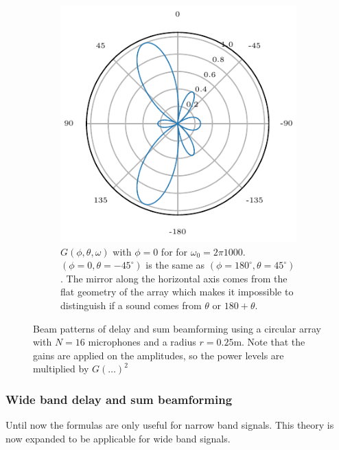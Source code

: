 \begin{figure}[ht]
\begin{subfigure}[t]{0.45\textwidth}
		\includegraphics[width=\textwidth]{radial_1200_circ_theta_single.pdf}
		\caption{\(G(\phi, \theta, \omega)\) with $\phi = 0$ for for $\omega_0 = 2\pi 1000$.
			$(\phi= 0, \theta = -45^\circ)$ is the same as $(\phi= 180^\circ, \theta = 45^\circ)$.
			The mirror along the horizontal axis comes from the flat geometry of the array which makes
			it impossible to distinguish if a sound comes from $\theta$ or $180 + \theta$.}
		\label{ssl:fig:CircBmTheta}
	\end{subfigure}
	\caption{Beam patterns of delay and sum beamforming using a circular array with $N=16$ microphones
		and a radius $r = 0.25$m. Note that the gains are applied on the amplitudes, so the
		power levels are multiplied by $G(\dots)^2$}
	\label{ssl:fig:CircBmResponse}
\end{figure}

\subsubsection*{Wide band delay and sum beamforming}
Until now the formulas are only useful for narrow band signals.
This theory is now expanded to be applicable for wide band signals.

